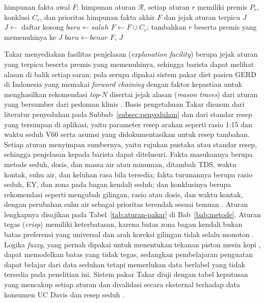 \begin{algorithm}[htbp]
\caption{\textit{Forward Chaining} dengan Jejak Aturan}
\label{alg:forward-chaining}
\begin{algorithmic}[1]
\Require himpunan fakta awal $F$; himpunan aturan $\mathcal{R}$, setiap aturan $r$ memiliki premis $P_r$, konklusi $C_r$, dan prioritas
\Ensure himpunan fakta akhir $F$ dan jejak aturan terpicu $J$
\State $J \gets$ daftar kosong
\Repeat
  \State $\mathit{baru} \gets \mathit{salah}$
      \State $F \gets F \cup C_r$; tambahkan $r$ beserta premis yang memenuhinya ke $J$
      \State $\mathit{baru} \gets \mathit{benar}$
    \EndIf
  \EndFor
{}
\State \Return $F$, $J$
\end{algorithmic}
\end{algorithm}

Takar menyediakan fasilitas penjelasan (\textit{explanation facility}) berupa jejak aturan yang terpicu beserta premis yang memenuhinya, sehingga barista dapat melihat alasan di balik setiap saran; pola serupa dipakai sistem pakar diet pasien GERD di Indonesia yang memakai \textit{forward chaining} dengan faktor kepastian untuk menghasilkan rekomendasi \textit{top}-$N$ disertai jejak alasan (\textit{reason traces}) dari aturan yang bersumber dari pedoman klinis \citep*{maulia2026rulebased}. Basis pengetahuan Takar disusun dari literatur penyeduhan pada Subbab~\ref{subsec:penyeduhan} dan dari standar resep yang tersimpan di aplikasi, yaitu parameter resep arahan seperti rasio 1:15 dan waktu seduh V60 serta asumsi yang didokumentasikan untuk resep tambahan. Setiap aturan menyimpan sumbernya, yaitu rujukan pustaka atau standar resep, sehingga penjelasan kepada barista dapat ditelusuri. Fakta masukannya berupa metode seduh, dosis, dan massa air atau minuman, ditambah TDS, waktu kontak, suhu air, dan keluhan rasa bila tersedia; fakta turunannya berupa rasio seduh, EY, dan zona pada bagan kendali seduh; dan konklusinya berupa rekomendasi seperti mengubah gilingan, rasio atau dosis, dan waktu kontak, dengan perubahan suhu air sebagai prioritas terendah sesuai temuan \citet*{batali2020brew}. Aturan lengkapnya disajikan pada Tabel~\ref{tab:aturan-pakar} di Bab~\ref{bab:metode}. Aturan tegas (\textit{crisp}) memiliki keterbatasan, karena batas zona bagan kendali bukan batas preferensi yang universal \citep*{cotter2020consumer} dan arah koreksi gilingan tidak selalu monoton \citep*{lee2023uneven}. Logika \textit{fuzzy}, yang pernah dipakai untuk menentukan tekanan piston mesin kopi \citep*{hadianto2023design}, dapat memodelkan batas yang tidak tegas, sedangkan pembelajaran penguatan dapat belajar dari data seduhan \citep*{bramantoro2025optimization} tetapi memerlukan data berlabel yang tidak tersedia pada penelitian ini. Sistem pakar Takar diuji dengan tabel keputusan yang mencakup setiap aturan dan divalidasi secara eksternal terhadap data konsumen UC Davis \citep*{ristenpart2023consumer} dan resep seduh \citet*{batali2020brew}.

